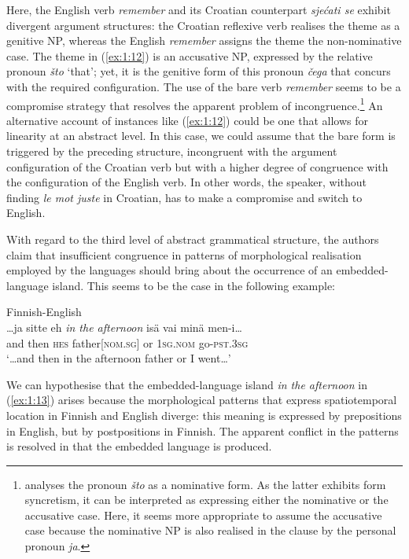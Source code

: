 \noindent Here, the English verb \textit{remember} and its Croatian counterpart \textit{sjećati se} exhibit divergent argument structures: the Croatian reflexive verb realises the theme as a genitive NP, whereas the English \textit{remember} assigns the theme the non-nominative case. The theme in (\ref{ex:1:12}) is an accusative NP, expressed by the relative pronoun \textit{što} `that'; yet, it is the genitive form of this pronoun \textit{čega} that concurs with the required configuration. The use of the bare verb \textit{remember} seems to be a compromise strategy that resolves the apparent problem of incongruence.\footnote{\citet[213]{hlavac-second-generation-2003} analyses the pronoun \textit{što} as a nominative form. As the latter exhibits form syncretism, it can be interpreted as expressing either the nominative or the accusative case. Here, it seems more appropriate to assume the accusative case because the nominative NP is also realised in the clause by the personal pronoun \textit{ja}.}
An alternative account of instances like (\ref{ex:1:12}) could be one that allows for linearity at an abstract level. In this case, we could assume that the bare form is triggered by the preceding structure, incongruent with the argument configuration of the Croatian verb but with a higher degree of congruence with the configuration of the English verb. In other words, the speaker, without finding \textit{le mot juste} in Croatian, has to make a compromise and switch to English.

With regard to the third level of abstract grammatical structure, the authors claim that insufficient congruence in patterns of morphological realisation employed by the languages should bring about the occurrence of an embedded-language island. This seems to be the case in the following example:

\ea{\label{ex:1:13}}
Finnish-English \citep[226]{lehtinen-analysis-1966}\\
\gll \dots ja sitte eh \textit{in the afternoon} isä vai minä men-i{\dots}\\
	\phantom{\dots}and then \textsc{hes} {} father[\textsc{nom.sg}] or \textsc{1sg.nom} go-\textsc{pst.3sg}\\
\glt `\dots and then in the afternoon father or I went{\dots}'
\z

\noindent We can hypothesise that the embedded-language island \textit{in the afternoon} in (\ref{ex:1:13}) arises because the morphological patterns that express spatiotemporal location in Finnish and English diverge: this meaning is expressed by prepositions in English, but by postpositions in Finnish. The apparent conflict in the patterns is resolved in that the embedded language is produced.

